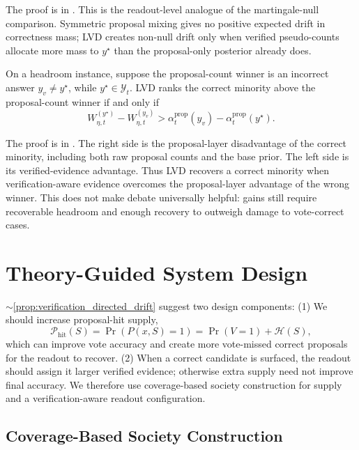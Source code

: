 The proof is in .
This is the readout-level analogue of the martingale-null comparison. Symmetric
proposal mixing gives no positive expected drift in correctness mass; LVD
creates non-null drift only when verified pseudo-counts allocate more mass to
$y^\star$ than the proposal-only posterior already does.

\begin{proposition}
\label{prop:correct_minority_recovery}
On a headroom instance, suppose the proposal-count winner is an incorrect answer
$y_v\ne y^\star$, while $y^\star\in\mathcal Y_t$. LVD ranks the correct minority
above the proposal-count winner if and only if
\begin{equation}
    W_{\eta,t}^{(y^\star)}-W_{\eta,t}^{(y_v)}
    >
    \alpha_t^{\mathrm{prop}}(y_v)-\alpha_t^{\mathrm{prop}}(y^\star).
    \label{eq:lvd_recovery_condition}
\end{equation}
\end{proposition}

The proof is in .
The right side is the proposal-layer disadvantage of the correct minority,
including both raw proposal counts and the base prior. The left side is its
verified-evidence advantage. Thus LVD recovers a correct minority when
verification-aware evidence overcomes the proposal-layer advantage of the wrong
winner. This does not make debate universally helpful: gains still require
recoverable headroom and enough recovery to outweigh damage to vote-correct
cases.

\section{Theory-Guided System Design}
\label{sec:supply}

$\sim$\ref{prop:verification_directed_drift} suggest two design components: (1) We should increase proposal-hit supply,
\[
    \mathcal P_{\mathrm{hit}}(S)=\Pr(P(x,S)=1)=\Pr(V=1)+\mathcal H(S),
\]
which can improve vote accuracy and create more vote-missed correct proposals
for the readout to recover. (2) When a correct candidate is surfaced, the readout
should assign it larger verified evidence; otherwise extra supply need not
improve final accuracy. We therefore use coverage-based society construction
for supply and a verification-aware readout configuration.

\subsection{Coverage-Based Society Construction}
\label{subsec:thicket_pool}

